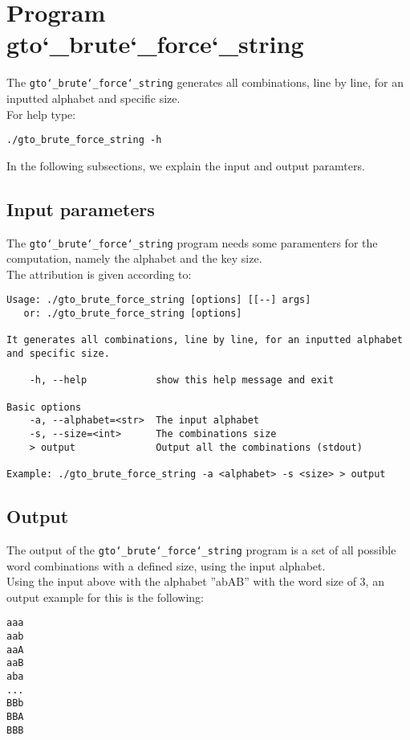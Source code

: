 \section{Program gto\char`_brute\char`_force\char`_string}
The \texttt{gto\char`_brute\char`_force\char`_string} generates all combinations, line by line, for an inputted alphabet and specific size.\\
For help type:
\begin{lstlisting}
./gto_brute_force_string -h
\end{lstlisting}
In the following subsections, we explain the input and output paramters.

\subsection*{Input parameters}

The \texttt{gto\char`_brute\char`_force\char`_string} program needs some paramenters for the computation, namely the alphabet and the key size.\\
The attribution is given according to:
\begin{lstlisting}
Usage: ./gto_brute_force_string [options] [[--] args]
   or: ./gto_brute_force_string [options]

It generates all combinations, line by line, for an inputted alphabet and specific size.

    -h, --help            show this help message and exit

Basic options
    -a, --alphabet=<str>  The input alphabet
    -s, --size=<int>      The combinations size
    > output              Output all the combinations (stdout)

Example: ./gto_brute_force_string -a <alphabet> -s <size> > output
\end{lstlisting}

\subsection*{Output}
The output of the \texttt{gto\char`_brute\char`_force\char`_string} program is a set of all possible word combinations with a defined size, using the input alphabet.\\
Using the input above with the alphabet ''abAB'' with the word size of 3, an output example for this is the following:
\begin{lstlisting}
aaa
aab
aaA
aaB
aba
...
BBb
BBA
BBB
\end{lstlisting}